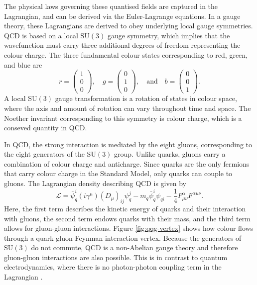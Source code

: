 \documentclass[12pt,a4paper]{report}
\begin{document}
The physical laws governing these quantised fields are captured in the Lagrangian, and can be derived via the Euler-Lagrange equations. In a gauge theory, these Lagrangians are derived to obey underlying local gauge symmetries. QCD is based on a local $\text{SU}(3)$ gauge symmetry, which implies that the wavefunction must carry three additional degrees of freedom representing the colour charge. The three fundamental colour states corresponding to red, green, and blue are
\begin{equation}
  r = \begin{pmatrix}1\\0\\0\end{pmatrix}, \quad g = \begin{pmatrix}0\\1\\0\end{pmatrix}, \quad \text{and} \quad b = \begin{pmatrix}0\\0\\1\end{pmatrix}.
\end{equation}
A local $\text{SU}(3)$ gauge transformation is a rotation of states in colour space, where the axis and amount of rotation can vary throughout time and space. The Noether invariant corresponding to this symmetry is colour charge, which is a conseved quantity in QCD.

In QCD, the strong interaction is mediated by the eight gluons, corresponding to the eight generators of the $\text{SU}(3)$ group. Unlike quarks, gluons carry a combination of colour charge and anticharge. Since quarks are the only fermions that carry colour charge in the Standard Model, only quarks can couple to gluons. The Lagrangian density describing QCD is given by
\begin{equation}
  \mathcal{L} = \bar{\psi}_q^i (i \gamma^\mu) (D_\mu)_{ij} \psi_q^j - m_q \bar{\psi}^i_q \psi_{qi} - \frac{1}{4} F_{\mu\nu}^\alpha F^{\alpha\mu\nu}.
\end{equation}
Here, the first term describes the kinetic energy of quarks and their interaction with gluons, the second term endows quarks with their mass, and the third term allows for gluon-gluon interactions. Figure \ref{fig:qqg-vertex} shows how colour flows through a quark-gluon Feynman interaction vertex. Because the generators of $\text{SU}(3)$ do not commute, QCD is a non-Abelian gauge theory and therefore gluon-gluon interactions are also possible. This is in contrast to quantum electrodynamics, where there is no photon-photon coupling term in the Lagrangian \cite{Thomson:2013zua,Ellis:1996mzs,ParticleDataGroup:2024cfk}.
\end{document}
